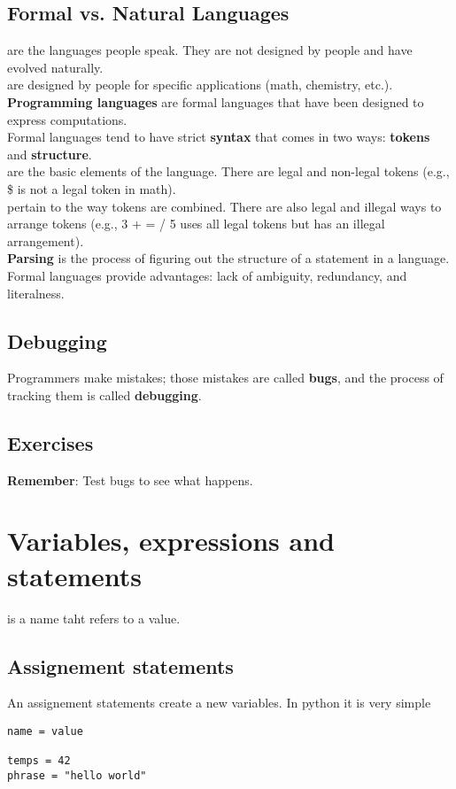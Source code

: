 \documentclass{report}
\begin{document}
\section{Formal vs. Natural Languages}

 are the languages people speak. They are not designed by people and have evolved naturally.\\
 are designed by people for specific applications (math, chemistry, etc.). \textbf{Programming languages} are formal languages that have been designed to express computations.\\
Formal languages tend to have strict \textbf{syntax} that comes in two ways: \textbf{tokens} and \textbf{structure}.\\
 are the basic elements of the language. There are legal and non-legal tokens (e.g., \$ is not a legal token in math).\\
 pertain to the way tokens are combined. There are also legal and illegal ways to arrange tokens (e.g., 3 + = / 5 uses all legal tokens but has an illegal arrangement).\\
\textbf{Parsing} is the process of figuring out the structure of a statement in a language.\\
Formal languages provide advantages: lack of ambiguity, redundancy, and literalness.\\

\section{Debugging}

Programmers make mistakes; those mistakes are called \textbf{bugs}, and the process of tracking them is called \textbf{debugging}.

\section{Exercises}

\textbf{Remember}: Test bugs to see what happens.





\chapter{Variables, expressions and statements}

 is a name taht refers to a value.
\section{Assignement statements}
An assignement statements create a new variables. In python it is very simple 
\begin{verbatim}
name = value

temps = 42
phrase = "hello world"
\end{verbatim}
\end{document}
